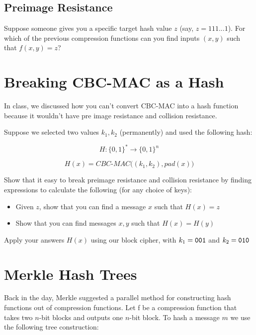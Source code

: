 \documentclass[12pt]{article}
\begin{document}
\subsection{Preimage Resistance}

Suppose someone gives you a specific target hash value $z$ (say, $z = 111...1$). For which of the previous compression functions can you find inputs $(x, y)$ such that $f(x, y) = z$?


\newpage
\section{Breaking CBC-MAC as a Hash}

In class, we discussed how you can't convert CBC-MAC into a hash function because it wouldn't have pre image resistance and collision resistance.

Suppose we selected two values $k_1, k_2$ (permanently) and used the following hash:

$$
H : \{0, 1\}^* \to \{0, 1\}^n
$$


$$
H(x) = CBC\text{-}MAC\Big((k_1, k_2), pad(x)\Big)
$$


Show that it easy to break preimage resistance and collision resistance by finding expressions to calculate the following (for any choice of keys):

\begin{itemize}
\item Given $z$, show that you can find a message $x$ such that $H(x) = z$
\item Show that you can find messages $x, y$ such that $H(x) = H(y)$
\end{itemize}

Apply your answers $H(x)$ using our block cipher, with $k_1 = {\tt 001}$ and $k_2 = {\tt 010}$




\newpage
\section{Merkle Hash Trees}


Back in the day, Merkle suggested a parallel method for constructing hash functions out of compression functions. Let f be a compression function that takes two $n$-bit blocks and outputs one $n$-bit block. To hash a message $m$ we use the following tree construction:
\end{document}
